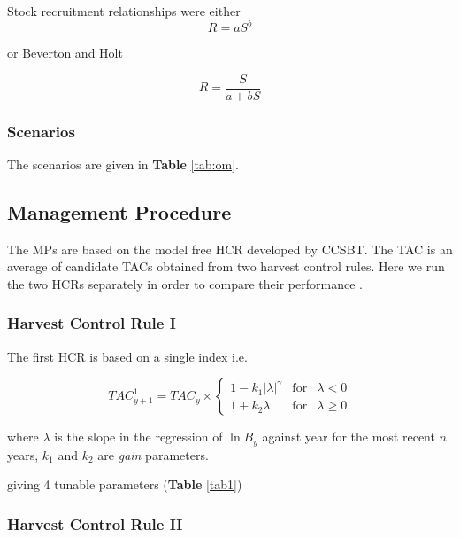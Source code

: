 \documentclass[%
nonumbib,      %
%
]{nrc1}                          %
\newcommand{\ds}{\displaystyle}
\begin{document}
Stock recruitment relationships were either \citep{cushing1973dependence}
\begin{equation} R=aS^b \end{equation}

or Beverton and Holt \citep{beverton1993dynamics}

\begin{equation} R=\frac{S}{a+bS} \end{equation}

\subsubsection{Scenarios}

The scenarios are given in \textbf{Table} \ref{tab:om}.

\subsection{Management Procedure}

The MPs are based on the model free HCR developed by CCSBT. The TAC is an average of candidate TACs obtained from two harvest control rules. Here we
run the two HCRs separately in order to compare their performance \citep{hillary2013sbthcr}.

\subsubsection{Harvest Control Rule I}

The first HCR is based on a single index i.e.

\begin{equation}
            \ds TAC^1_{y+1}=TAC_y\times \left\{\begin{array}{rcl}\ds{1-k_1|\lambda|^{\gamma}} & \mbox{for} & \lambda<0\\[0.35cm]
\ds{1+k_2\lambda} & \mbox{for} & \lambda\geq 0 
    \end{array}\right.
\end{equation}
        

 where $\lambda$ is the slope in the regression of $\ln B_y$ against year for the most recent $n$ years,  
 $k_1$ and $k_2$ are \textit{gain} parameters.

giving 4 tunable parameters (\textbf{Table} \ref{tab1})


\subsubsection{Harvest Control Rule II}
\end{document}
